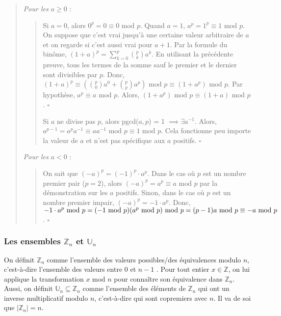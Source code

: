 \begin{quote}
    
    \textit{Pour les $a \geq 0$} : 

    \begin{quote}
        Si $a = 0$, alors $0^p = 0 \equiv 0 \text{ mod } p$. Quand $a=1$, $a^p = 1^p \equiv 1 \text{ mod } p$. On suppose que c'est vrai jusqu'à une certaine valeur arbitraire de $a$ et on regarde si c'est aussi vrai pour $a+1$. Par la formule du binôme, $(1 + a)^p = \sum_{k=0}^{p}\binom{p}{k}a^k$. En utilisant la précédente preuve, tous les termes de la somme sauf le premier et le dernier sont divisibles par $p$. Donc, $(1 + a)^p \equiv (\binom{p}{0}a^0 + \binom{p}{p}a^p) \text{ mod } p \equiv (1+a^p) \text{ mod } p$. Par hypothèse, $a^p \equiv a \text{ mod } p$. Alors, $(1+a^p) \text{ mod } p \equiv (1+a) \text{ mod } p$. $\square$

        Si $a$ ne divise pas $p$, alors pgcd($a,p$) = 1 $\implies \exists a^{-1}$. Alors, $a^{p-1} = a^pa^{-1} \equiv aa^{-1} \text{ mod } p \equiv 1 \text{ mod } p$. Cela fonctionne peu importe la valeur de $a$ et n'est pas spécifique aux $a$ positifs. $\square$
    \end{quote}

    \textit{Pour les $a < 0$} :

    \begin{quote}
        On sait que $(-a)^p = (-1)^p \cdot a^p$. Dans le cas où $p$ est un nombre premier pair ($p = 2$), alors $(-a)^p = a^p \equiv a \text{ mod } p$ par la démonstration sur les $a$ positifs. Sinon, dans le cas où $p$ est un nombre premier impair, $(-a)^p = -1 \cdot a^p$. Donc, $-1 \cdot a^p \text{ mod } p = (-1 \text{ mod } p)(a^p \text{ mod } p) \text{ mod } p \\ = (p-1)a \text{ mod } p \equiv -a \text{ mod } p$. $\square$
    \end{quote}

\end{quote}

\subsubsection*{Les ensembles $\mathbb{Z}_n$ et $\mathbb{U}_n$}
On définit $\mathbb{Z}_n$ comme l'ensemble des valeurs possibles/des équivalences modulo $n$, c'est-à-dire l'ensemble des valeurs entre 0 et $n-1$ \cite{key}. Pour tout entier $x \in \mathbb{Z}$, on lui applique la transformation $x \text{ mod } n$ pour connaître son équivalence dans $\mathbb{Z}_n$. Aussi, on définit $\mathbb{U}_n \subseteq \mathbb{Z}_n$ comme l'ensemble des éléments de $\mathbb{Z}_n$ qui ont un inverse multiplicatif modulo $n$, c'est-à-dire qui sont copremiers avec $n$. Il va de soi que $|\mathbb{Z}_n| = n$.

